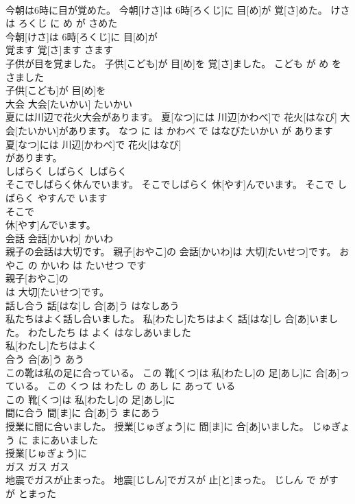 \documentclass[8pt]{extreport}
\begin{document}
\begin{CJK}{UTF8}{min}
\\	今朝は6時に目が覚めた。	今朝[けさ]は 6時[ろくじ]に 目[め]が 覚[さ]めた。	けさ は ろくじ に め が さめた	
\\	今朝[けさ]は 6時[ろくじ]に 目[め]が
\\	覚ます	覚[さ]ます	さます	
\\	子供が目を覚ました。	子供[こども]が 目[め]を 覚[さ]ました。	こども が め を さました	
\\	子供[こども]が 目[め]を
\\	大会	大会[たいかい]	たいかい	
\\	夏には川辺で花火大会があります。	夏[なつ]には 川辺[かわべ]で 花火[はなび] 大会[たいかい]があります。	なつ に は かわべ で はなびたいかい が あります	
\\	夏[なつ]には 川辺[かわべ]で 花火[はなび]
\\	があります。			
\\	しばらく	しばらく	しばらく	
\\	そこでしばらく休んでいます。	そこでしばらく 休[やす]んでいます。	そこで しばらく やすんで います	
\\	そこで
\\	休[やす]んでいます。			
\\	会話	会話[かいわ]	かいわ	
\\	親子の会話は大切です。	親子[おやこ]の 会話[かいわ]は 大切[たいせつ]です。	おやこ の かいわ は たいせつ です	
\\	親子[おやこ]の
\\	は 大切[たいせつ]です。			
\\	話し合う	話[はな]し 合[あ]う	はなしあう	
\\	私たちはよく話し合いました。	私[わたし]たちはよく 話[はな]し 合[あ]いました。	わたしたち は よく はなしあいました	
\\	私[わたし]たちはよく
\\	合う	合[あ]う	あう	
\\	この靴は私の足に合っている。	この 靴[くつ]は 私[わたし]の 足[あし]に 合[あ]っている。	この くつ は わたし の あし に あって いる	
\\	この 靴[くつ]は 私[わたし]の 足[あし]に
\\	間に合う	間[ま]に 合[あ]う	まにあう	
\\	授業に間に合いました。	授業[じゅぎょう]に 間[ま]に 合[あ]いました。	じゅぎょう に まにあいました	
\\	授業[じゅぎょう]に
\\	ガス	ガス	ガス	
\\	地震でガスが止まった。	地震[じしん]でガスが 止[と]まった。	じしん で がす が とまった	

\end{CJK}
\end{document}

